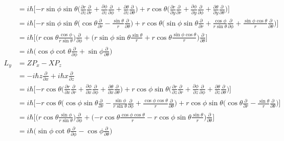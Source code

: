 \documentclass[../principles-of-quantum-mechanics.tex]{subfiles}
\begin{document}
\begin{questions}
\begin{solution}
\begin{align*}
			&= i\hbar\Big[{-r\sin\phi}\sin\theta\Big(\frac{\partial r}{\partial z}\frac{\partial}{\partial r} + \frac{\partial \phi}{\partial z}\frac{\partial}{\partial \phi} + \frac{\partial \theta}{\partial z}\frac{\partial}{\partial\theta}\Big) + r\cos\theta\Big(\frac{\partial r}{\partial y}\frac{\partial}{\partial r} + \frac{\partial \phi}{\partial y}\frac{\partial}{\partial \phi} + \frac{\partial \theta}{\partial y}\frac{\partial}{\partial\theta}\Big)\Big] \\
			&= i\hbar\Big[{-r\sin\phi}\sin\theta\Big(\cos\theta\frac{\partial}{\partial r} - \frac{\sin\theta}{r}\frac{\partial}{\partial\theta}\Big) + r\cos\theta\Big(\sin\phi\sin\theta\frac{\partial}{\partial r} + \frac{\cos\phi}{r\sin\theta}\frac{\partial}{\partial \phi} + \frac{\sin\phi\cos\theta}{r}\frac{\partial}{\partial\theta}\Big)\Big] \\
			&= i\hbar\Big[\Big(r\cos\theta\frac{\cos\phi}{r\sin\theta}\Big)\frac{\partial}{\partial \phi} + \Big(r\sin\phi\sin\theta\frac{\sin\theta}{r} + r\cos\theta\frac{\sin\phi\cos\theta}{r}\Big)\frac{\partial}{\partial\theta}\Big] \\
			&= i\hbar\Big(\cos\phi\cot\theta\frac{\partial}{\partial\phi} + \sin\phi\frac{\partial}{\partial\theta}\Big) \\
			L_y &= ZP_x - XP_z \\
			&= -i\hbar z\frac{\partial}{\partial x} + i\hbar x\frac{\partial}{\partial z} \\
			&= i\hbar\Big[{-r\cos\theta}\Big(\frac{\partial r}{\partial x}\frac{\partial}{\partial r} + \frac{\partial \phi}{\partial x}\frac{\partial}{\partial \phi} + \frac{\partial \theta}{\partial x}\frac{\partial}{\partial\theta}\Big) + r\cos\phi\sin\theta\Big(\frac{\partial r}{\partial z}\frac{\partial}{\partial r} + \frac{\partial \phi}{\partial z}\frac{\partial}{\partial \phi} + \frac{\partial \theta}{\partial z}\frac{\partial}{\partial\theta}\Big)\Big] \\
			&= i\hbar\Big[{-r\cos\theta}\Big(\cos\phi\sin\theta\frac{\partial}{\partial r} - \frac{\sin\phi}{r\sin\theta}\frac{\partial}{\partial \phi} + \frac{\cos\phi\cos\theta}{r}\frac{\partial}{\partial \theta}\Big) + r\cos\phi\sin\theta\Big(\cos\theta\frac{\partial}{\partial r} - \frac{\sin\theta}{r}\frac{\partial}{\partial \theta}\Big)\Big] \\
			&= i\hbar\Big[\Big(r\cos\theta\frac{\sin\phi}{r\sin\theta}\Big)\frac{\partial}{\partial \phi} + \Big({-r\cos\theta}\frac{\cos\phi\cos\theta}{r} - r\cos\phi\sin\theta\frac{\sin\theta}{r}\Big)\frac{\partial}{\partial\theta}\Big] \\
			&= i\hbar\Big(\sin\phi\cot\theta\frac{\partial}{\partial\phi} - \cos\phi\frac{\partial}{\partial\theta}\Big)
			\end{align*}
		\end{solution}
	\end{questions}
\end{document}

